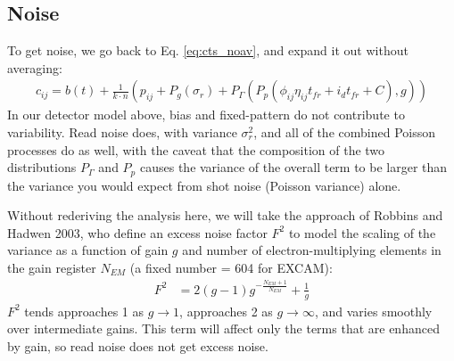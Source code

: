 \documentclass{article}
\begin{document}
\subsection{Noise}

To get noise, we go back to Eq. \ref{eq:cts_noav}, and expand it out without averaging:
\begin{align}
c_{ij} = b(t) + \frac{1}{k\cdot n} \left(p_{ij} + P_g(\sigma_r) + P_\Gamma\left(P_p\left( \phi_{ij} \eta_{ij} t_{fr} + i_d t_{fr} + C \right), g \right)\right)
\end{align}
In our detector model above, bias and fixed-pattern do not contribute to variability.  Read noise does, with variance $\sigma_{r}^2$, and all of the combined Poisson processes do as well, with the caveat that the composition of the two distributions $P_\Gamma$ and $P_p$ causes the variance of the overall term to be larger than the variance you would expect from shot noise (Poisson variance) alone.

Without rederiving the analysis here, we will take the approach of Robbins and Hadwen 2003, who define an excess noise factor $F^2$ to model the scaling of the variance as a function of gain $g$ and number of electron-multiplying elements in the gain register $N_{EM}$ (a fixed number = 604 for EXCAM):
\begin{align}
F^2 &= 2(g - 1) g^{-\frac{N_{EM}+1}{N_{EM}}} + \frac{1}{g}
\end{align}
$F^2$ tends approaches 1 as $g \rightarrow 1$, approaches 2 as $g \rightarrow \infty$, and varies smoothly over intermediate gains.  This term will affect only the terms that are enhanced by gain, so read noise does not get excess noise.
\end{document}
